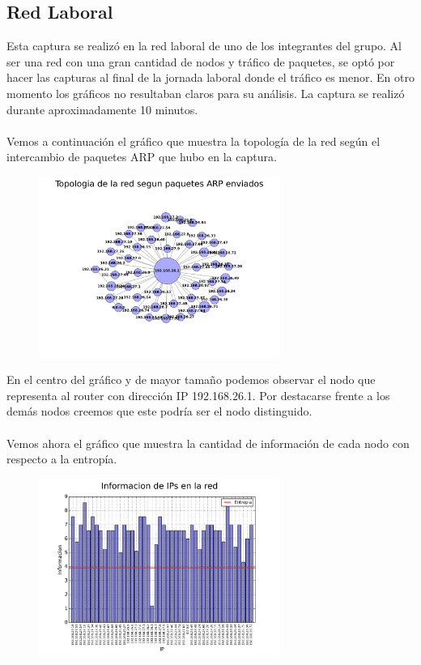 \subsection{Red Laboral}

Esta captura se realizó en la red laboral de uno de los integrantes del grupo. Al ser una red con una gran cantidad de nodos y tráfico de paquetes, se optó por hacer las capturas al final de la jornada laboral donde el tráfico es menor. En otro momento los gráficos no resultaban claros para su análisis. La captura se realizó durante aproximadamente 10 minutos.
\\\\
Vemos a continuación el gráfico que muestra la topología de la red según el intercambio de paquetes ARP que hubo en la captura.

\FloatBarrier

\begin{figure}[ht!]
  \centering
   \includegraphics[width=0.7\textwidth]{graficos/laboral_network.png}
  \caption{}
  \label{fig:laboral_network}
\end{figure}

\FloatBarrier

En el centro del gráfico y de mayor tamaño podemos observar el nodo que representa al router con dirección IP 192.168.26.1. Por destacarse frente a los demás nodos creemos que este podría ser el nodo distinguido.
\\\\
Vemos ahora el gráfico que muestra la cantidad de información de cada nodo con respecto a la entropía.

\FloatBarrier

\begin{figure}[ht!]
  \centering
   \includegraphics[width=0.7\textwidth]{graficos/laboral_information_bars_arp.png}
  \caption{}
  \label{fig:laboral_information_bars_arp}
\end{figure}

